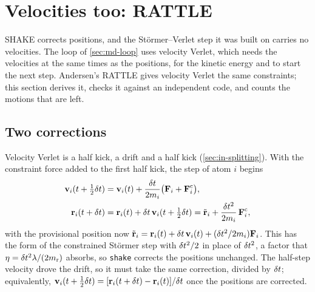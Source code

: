 \section{Velocities too: RATTLE}
\label{sec:cs-rattle}

SHAKE corrects positions, and the Störmer--Verlet step it was built on
carries no velocities. The loop of \cref{sec:md-loop} uses velocity
Verlet, which needs the velocities at the same times as the positions,
for the kinetic energy and to start the next step. Andersen's RATTLE
gives velocity Verlet the same constraints\cite{Andersen1983}; this
section derives it, checks it against an independent code, and counts
the motions that are left.

\subsection*{Two corrections}

Velocity Verlet is a half kick, a drift and a half kick
(\cref{sec:in-splitting}). With the constraint force added to the first
half kick, the step of atom $i$ begins
\begin{align*}
   \bm{\mathrm{v}}_i(t + \tfrac12\delta t) &= \bm{\mathrm{v}}_i(t) + \frac{\delta t}{2m_i}
      \bigl(\bm{\mathrm{F}}_i + \bm{\mathrm{F}}_i^{\mathrm c}\bigr) ,\\
   \bm{\mathrm{r}}_i(t + \delta t) &= \bm{\mathrm{r}}_i(t) + \delta t\,\bm{\mathrm{v}}_i(t + \tfrac12\delta t)
   = \tilde{\bm{\mathrm{r}}}_i + \frac{\delta t^2}{2m_i}\,\bm{\mathrm{F}}_i^{\mathrm c} ,
\end{align*}
with the provisional position now $\tilde{\bm{\mathrm{r}}}_i = \bm{\mathrm{r}}_i(t) +
\delta t\,\bm{\mathrm{v}}_i(t) + (\delta t^2/2m_i)\bm{\mathrm{F}}_i$. This has the form of the
constrained Störmer step with $\delta t^2/2$ in place of $\delta t^2$, a factor
that $\eta = \delta t^2\lambda/(2m_{\mathrm r})$ absorbs, so \texttt{shake}
corrects the positions unchanged. The half-step velocity drove the drift,
so it must take the same correction, divided by $\delta t$; equivalently,
$\bm{\mathrm{v}}_i(t + \frac12\delta t) = [\bm{\mathrm{r}}_i(t + \delta t) - \bm{\mathrm{r}}_i(t)]/\delta t$ once the
positions are corrected.

